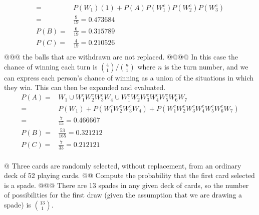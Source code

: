 \documentclass[10pt]{article}
\begin{document}
\begin{easylist}[enumerate]
\[\begin{aligned}
                     =& P(W_1 )(1) + P (A)P (W_1^c )P (W_2^c )P (W_3^c )\\
                     =& \frac{9}{19} = \boxed{0.473684}\\
                P(B) =& \frac{6}{19} = \boxed{0.315789}\\
                P(C) =& \frac{4}{19} = \boxed{0.210526}\\
            \end{aligned}
        \]
    @@@ the balls that are withdrawn are not replaced.
    @@@@ In this case the chance of winning each turn is $\binom{4}{1}\Big /\binom{n}{1}$ where $n$ is the turn number,
    and we can express each person's chance of winning as a union of the situations in which they win. This can then be
    expanded and evaluated.
        \[
            \begin{aligned}
                P(A) =& W_1 \cup W_1^c W_2^c W_3^c W_4 \cup W_1^c W_2^c W_3^c W_4^c W_5^c W_6^c W_7\\
                     =& P(W_1) + P(W_1^c W_2^c W_3^c W_4) + P(W_1^c W_2^c W_3^c W_4^c W_5^c W_6^c W_7)\\
                     =& \frac{7}{15} = \boxed{0.466667}\\
                P(B) =& \frac{53}{165} = \boxed{0.321212}\\
                P(C) =& \frac{7}{33} = \boxed{0.212121}\\
            \end{aligned}
        \]

    @ Three cards are randomly selected, without replacement, from an ordinary deck of 52 playing cards.
    @@ Compute the probability that the first card selected is a spade.
    @@@ There are 13 spades in any given deck of cards, so the number of possibilities for the first draw (given the
    assumption that we are drawing a spade) is $\binom{13}{1}$.\newline


\end{easylist}
\end{document}
